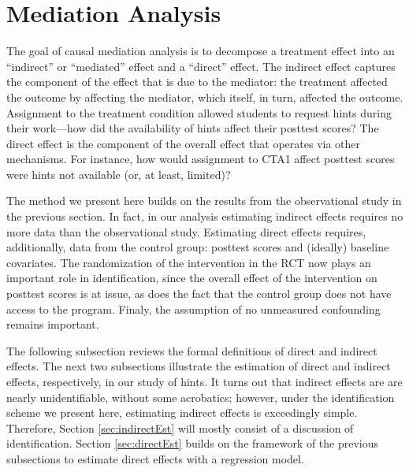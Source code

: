 \documentclass{article}\usepackage[]{graphicx}\usepackage[]{color}
\begin{document}
\section{Mediation Analysis}\label{sec:mediation}
The goal of causal mediation analysis is to decompose a treatment
effect into an ``indirect'' or ``mediated''
effect and a ``direct'' effect.
The indirect effect captures the component of the effect that is due
to the mediator: the treatment affected the outcome by affecting the
mediator, which itself, in turn, affected the outcome.
Assignment to the treatment condition allowed students to request hints during their work---how did the availability of hints affect their posttest scores?
The direct effect is the component of the overall effect that operates via other mechanisms. 
For instance, how would assignment to CTA1 affect posttest scores were hints not available (or, at least, limited)?


The method we present here builds on the results from the observational study in the previous section.
In fact, in our analysis estimating indirect effects requires no more data than the observational study.
Estimating direct effects requires, additionally, data from the control group: posttest scores and (ideally) baseline covariates.
The randomization of the intervention in the RCT now plays an important role in identification, since the overall effect of the intervention on posttest scores is at issue, as does the fact that the control group does not have access to the program.
Finaly, the assumption of no unmeasured confounding remains important.

The following subsection reviews the formal definitions of direct and indirect effects.
The next two subsections illustrate the estimation of direct and indirect effects, respectively, in our study of hints.
It turns out that indirect effects are are nearly unidentifiable, without some acrobatics; however, under the identification scheme we present here, estimating indirect effects is exceedingly simple.
Therefore, Section \ref{sec:indirectEst} will mostly consist of a discussion of identification.
Section \ref{sec:directEst} builds on the framework of the previous subsections to estimate direct effects with a regression model.
\end{document}
